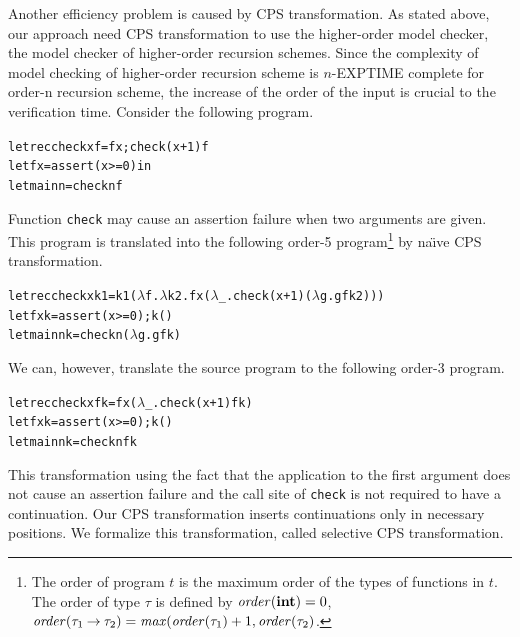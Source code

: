 Another efficiency problem is caused by CPS transformation.
As stated above, our approach need CPS transformation to use the
higher-order model checker, the model checker of higher-order recursion
schemes.  Since the complexity of model checking of higher-order
recursion scheme is $n$-EXPTIME complete for order-n
recursion scheme, the increase of the order of the input is crucial to
the verification time.  Consider the following program.
\begin{alltt}
let rec check x f = f x; check (x+1) f
let f x = assert (x >= 0) in
let main n = check n f
\end{alltt}
Function \texttt{check} may cause an assertion failure when two arguments are
given.  This program is translated into the following order-5
program\footnote{The order of program $t$ is the maximum order of the
types of functions in $t$.  The order of type $\tau$ is defined by
$\mathit{order}(\mathbf{int})=0$, $\mathit{order}({\tau_1}\mathbin{\rightarrow}{\tau_2}) =
\mathit{max}(\mathit{order}(\tau_1)+1, \mathit{order}(\tau_2)$.}  by
na\"{\i}ve CPS transformation.
\begin{alltt}
let rec check x k1 = k1 (\(\lambda\)f.\(\lambda\)k2.f x (\(\lambda\)_.check (x+1) (\(\lambda\)g.g f k2)))
let f x k = assert (x >= 0); k ()
let main n k = check n (\(\lambda\)g. g f k)
\end{alltt}
We can, however, translate the source program to the following order-3 program.
\begin{alltt}
let rec check x f k = f x (\(\lambda\)_.check (x+1) f k)
let f x k = assert (x >= 0); k ()
let main n k = check n f k
\end{alltt}
This transformation using the fact that the application to the first
argument does not cause an assertion failure and the call site of
\texttt{check} is not required to have a continuation.
Our CPS transformation inserts continuations only in necessary positions.
We formalize this transformation, called selective CPS transformation.

